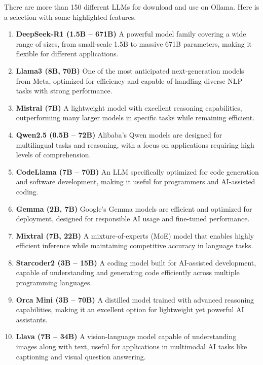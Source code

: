 There are more than 150 different LLMs for download and use on Ollama. Here is a selection with some highlighted features. 

\begin{enumerate}
    \item \textbf{DeepSeek-R1 (1.5B – 671B)}  
    A powerful model family covering a wide range of sizes, from small-scale 1.5B to massive 671B parameters, making it flexible for different applications.
    
    \item \textbf{Llama3 (8B, 70B)}  
    One of the most anticipated next-generation models from Meta, optimized for efficiency and capable of handling diverse NLP tasks with strong performance.
    
    \item \textbf{Mistral (7B)}  
    A lightweight model with excellent reasoning capabilities, outperforming many larger models in specific tasks while remaining efficient.
    
    \item \textbf{Qwen2.5 (0.5B – 72B)}  
    Alibaba’s Qwen models are designed for multilingual tasks and reasoning, with a focus on applications requiring high levels of comprehension.
    
    \item \textbf{CodeLlama (7B – 70B)}  
    An LLM specifically optimized for code generation and software development, making it useful for programmers and AI-assisted coding.
    
    \item \textbf{Gemma (2B, 7B)}  
    Google’s Gemma models are efficient and optimized for deployment, designed for responsible AI usage and fine-tuned performance.
    
    \item \textbf{Mixtral (7B, 22B)}  
    A mixture-of-experts (MoE) model that enables highly efficient inference while maintaining competitive accuracy in language tasks.
    
    \item \textbf{Starcoder2 (3B – 15B)}  
    A coding model built for AI-assisted development, capable of understanding and generating code efficiently across multiple programming languages.
    
    \item \textbf{Orca Mini (3B – 70B)}  
    A distilled model trained with advanced reasoning capabilities, making it an excellent option for lightweight yet powerful AI assistants.
    
    \item \textbf{Llava (7B – 34B)}  
    A vision-language model capable of understanding images along with text, useful for applications in multimodal AI tasks like captioning and visual question answering.
\end{enumerate}

